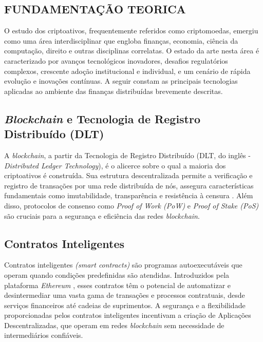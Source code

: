 \documentclass[article,12pt,oneside,a4paper,english,brazil]{unifil}
\begin{document}
\begin{Spacing}{1.5}

% 

\section*{FUNDAMENTAÇÃO TEORICA}
O estudo dos criptoativos, frequentemente referidos como criptomoedas, emergiu como uma área interdisciplinar que engloba finanças, economia, ciência da computação, direito e outras disciplinas correlatas. O estado da arte nesta área é caracterizado por avanços tecnológicos inovadores, desafios regulatórios complexos, crescente adoção institucional e individual, e um cenário de rápida evolução e inovações contínuas. A seguir constam as principais tecnologias aplicadas ao ambiente das finanças distribuídas brevemente descritas.

\subsection*{\textit{Blockchain} e Tecnologia de Registro Distribuído (DLT)}

A \textit{blockchain}, a partir da Tecnologia de Registro Distribuído (DLT, do inglês - \textit{Distributed Ledger Technology}), é o alicerce sobre o qual a maioria dos criptoativos é construída. Sua estrutura descentralizada  permite a verificação e registro de transações por uma rede distribuída de nós, assegura características fundamentais como imutabilidade, transparência e resistência à censura \cite{Nakamoto2009}. Além disso, protocolos de consenso como \textit{Proof of Work (PoW)} e \textit{Proof of Stake (PoS)} são cruciais para a segurança e eficiência das redes \textit{blockchain}.

\subsection*{Contratos Inteligentes}

Contratos inteligentes \textit{(smart contracts)} são programas autoexecutáveis que operam quando condições predefinidas são atendidas. Introduzidos pela plataforma \textit{Ethereum} \cite{buterin2013ethereum}, esses contratos têm o potencial de automatizar e desintermediar uma vasta gama de transações e processos contratuais, desde serviços financeiros até cadeias de suprimentos. A segurança e a flexibilidade proporcionadas pelos contratos inteligentes incentivam a criação de Aplicações Descentralizadas, que operam em redes \textit{blockchain} sem necessidade de intermediários confiáveis.


\end{Spacing}
\end{document}
